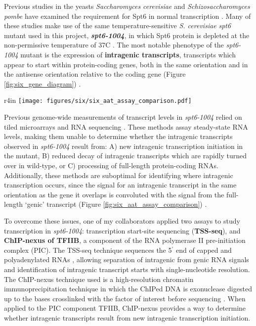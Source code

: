 Previous studies in the yeasts \textit{Saccharomyces cerevisiae} and \textit{Schizosaccharomyces pombe} have examined the requirement for Spt6 in normal transcription \citep{cheung2008, degennaro2013, kaplan2003, pathak2018, uwimana2017, vanbakel2013}.
Many of these studies make use of the same temperature-sensitive \textit{S. cerevisiae} \textit{spt6} mutant used in this project, \textbf{\textit{spt6-1004}}, in which Spt6 protein is depleted at the non-permissive temperature of 37\textdegree C \citep{kaplan2003}.
The most notable phenotype of the \textit{spt6-1004} mutant is the expression of \textbf{intragenic transcripts}, transcripts which appear to start within protein-coding genes, both in the same orientation and in the antisense orientation relative to the coding gene (Figure \ref{fig:six_gene_diagram}) \citep{cheung2008, degennaro2013, kaplan2003, uwimana2017}.

\begin{wrapfigure}[11]{r}{4in}
\centering
\texttt{[image: figures/six/six\_aat\_assay\_comparison.pdf]}
\caption[RNA-seq, TSS-seq, and TFIIB ChIP-nexus signal at the \textit{AAT2} gene, in \textit{spt6-1004} after 80 minutes at 37\textdegree C.]{Sense strand RNA-seq signal, sense strand TSS-seq signal, and TFIIB ChIP-nexus protection at the \textit{AAT2} gene, in \textit{spt6-1004} after 80 minutes at 37\textdegree C.}
\label{fig:six_aat_assay_comparison}
\end{wrapfigure}

Previous genome-wide measurements of transcript levels in \textit{spt6-1004} relied on tiled microarrays \citep{cheung2008} and RNA sequencing \citep{uwimana2017}.
These methods assay steady-state RNA levels, making them unable to determine whether the intragenic transcripts observed in \textit{spt6-1004} result from: A) new intragenic transcription initiation in the mutant, B) reduced decay of intragenic transcripts which are rapidly turned over in wild-type, or C) processing of full-length protein-coding RNAs.
Additionally, these methods are suboptimal for identifying where intragenic transcription occurs, since the signal for an intragenic transcript in the same orientation as the gene it overlaps is convoluted with the signal from the full-length `genic' transcript (Figure \ref{fig:six_aat_assay_comparison}) \citep{cheung2008, lickwar2009}.

To overcome these issues, one of my collaborators applied two assays to study transcription in \textit{spt6-1004}: transcription start-site sequencing (\textbf{TSS-seq}), and \textbf{ChIP-nexus of TFIIB}, a component of the RNA polymerase II pre-initiation complex (PIC).
The TSS-seq technique sequences the 5$^\prime$ end of capped and polyadenylated RNAs \citep{arribere2013, malabat2015}, allowing separation of intragenic from genic RNA signals and identification of intragenic transcript starts with single-nucleotide resolution.
The ChIP-nexus technique used is a high-resolution chromatin immunoprecipitation technique in which the ChIPed DNA is exonuclease digested up to the bases crosslinked with the factor of interest before sequencing \citep{he2015}.
When applied to the PIC component TFIIB, ChIP-nexus provides a way to determine whether intragenic transcripts result from new intragenic transcription initiation.

